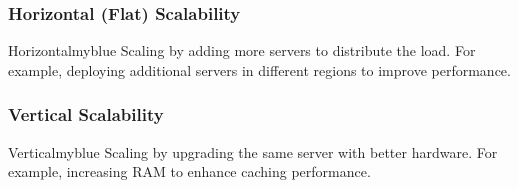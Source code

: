 \subsubsection{Horizontal (Flat) Scalability}  
\begin{prettyBox}{Horizontal}{myblue}  
Scaling by adding more servers to distribute the load.  
For example, deploying additional servers in different regions to improve performance.  
\end{prettyBox}  

\vspace{0.25cm}  

\subsubsection{Vertical Scalability}  
\begin{prettyBox}{Vertical}{myblue}  
Scaling by upgrading the same server with better hardware.  
For example, increasing RAM to enhance caching performance.  
\end{prettyBox}  

